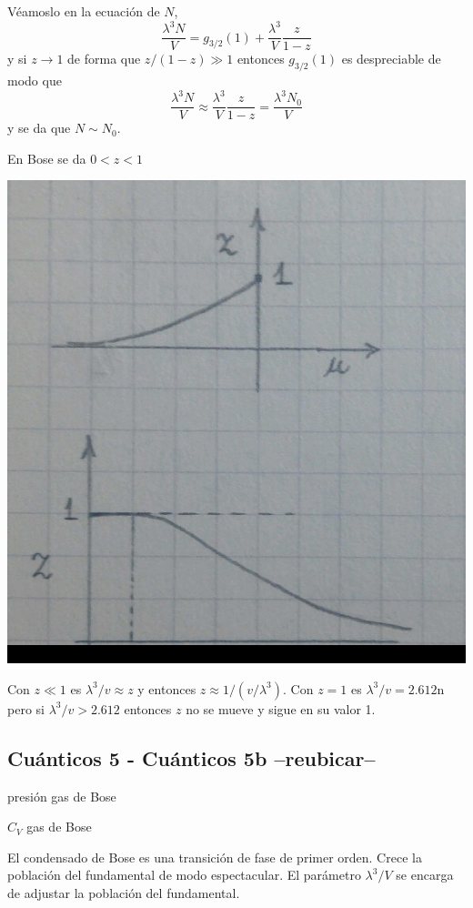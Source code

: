 \documentclass[10pt,oneside]{CBFT_book}
\begin{document}
Véamoslo en la ecuación de $N$,
\[
	\frac{\lambda^3 N}{V} = g_{3/2}(1) + \frac{\lambda^3}{V} \frac{z}{1-z}
\]
y si $z \to 1$ de forma que $z/(1-z) \gg 1$ entonces $g_{3/2}(1)$ es despreciable de modo que
\[
	\frac{\lambda^3 N}{V} \approx \frac{\lambda^3}{V} \frac{z}{1-z} = \frac{\lambda^3 N_0}{V} 
\]
y se da que $ N \sim N_0 $.

En Bose se da $ 0 < z < 1$

\includegraphics[scale=0.5]{images/1625624397.jpg}

Con $ z \ll 1$ es $ \lambda^3 / v \approx z $ y entonces $ z \approx 1/ (v/\lambda^3) $.
Con $ z=1 $ es $ \lambda^3 / v = 2.612$n pero si $ \lambda^3 / v > 2.612 $ entonces $z$ no se mueve y
sigue en su valor 1.


\subsection{Cuánticos 5 - Cuánticos 5b --reubicar--}

presión gas de Bose

$C_V$ gas de Bose

El condensado de Bose es una transición de fase de primer orden.
Crece la población del fundamental de modo espectacular. El parámetro $ \lambda^3/V $ se encarga de
adjustar la población del fundamental.
\end{document}
